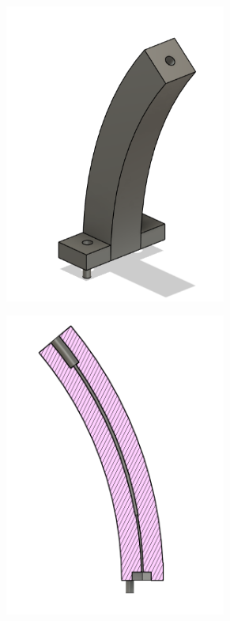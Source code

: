 \documentclass[a4paper,11pt]{article}
\begin{document}
\begin{figure}[h!]
\centering
\begin{subfigure}{0.5\textwidth}
\centering
    \includegraphics[width=0.8\textwidth]{OldFibreCouplerDesign.png}
    \subcaption{}\label{fig:oldFibreCoupler}
\end{subfigure}%
\begin{subfigure}{0.5\textwidth}
\centering
    \includegraphics[width=0.8\textwidth]{Screenshot 2025-10-07 170014.png}

\end{subfigure}
\end{figure}
\end{document}
